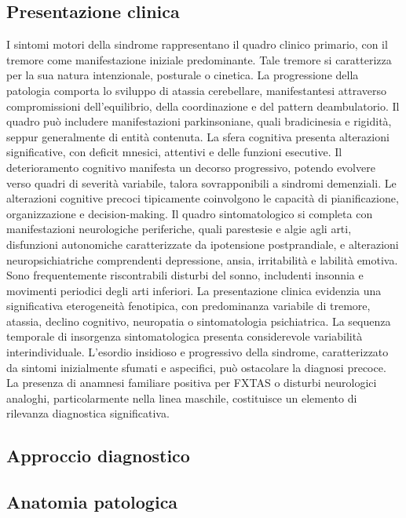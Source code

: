\subsection{Presentazione clinica}
I sintomi motori della sindrome rappresentano il quadro clinico primario, con il tremore come manifestazione iniziale predominante. Tale tremore si caratterizza per la sua natura intenzionale, posturale o cinetica. La progressione della patologia comporta lo sviluppo di atassia cerebellare, manifestantesi attraverso compromissioni dell'equilibrio, della coordinazione e del pattern deambulatorio. Il quadro può includere manifestazioni parkinsoniane, quali bradicinesia e rigidità, seppur generalmente di entità contenuta.
La sfera cognitiva presenta alterazioni significative, con deficit mnesici, attentivi e delle funzioni esecutive. Il deterioramento cognitivo manifesta un decorso progressivo, potendo evolvere verso quadri di severità variabile, talora sovrapponibili a sindromi demenziali. Le alterazioni cognitive precoci tipicamente coinvolgono le capacità di pianificazione, organizzazione e decision-making.
Il quadro sintomatologico si completa con manifestazioni neurologiche periferiche, quali parestesie e algie agli arti, disfunzioni autonomiche caratterizzate da ipotensione postprandiale, e alterazioni neuropsichiatriche comprendenti depressione, ansia, irritabilità e labilità emotiva. Sono frequentemente riscontrabili disturbi del sonno, includenti insonnia e movimenti periodici degli arti inferiori.
La presentazione clinica evidenzia una significativa eterogeneità fenotipica, con predominanza variabile di tremore, atassia, declino cognitivo, neuropatia o sintomatologia psichiatrica. La sequenza temporale di insorgenza sintomatologica presenta considerevole variabilità interindividuale.
L'esordio insidioso e progressivo della sindrome, caratterizzato da sintomi inizialmente sfumati e aspecifici, può ostacolare la diagnosi precoce. La presenza di anamnesi familiare positiva per FXTAS o disturbi neurologici analoghi, particolarmente nella linea maschile, costituisce un elemento di rilevanza diagnostica significativa.

\subsection{Approccio diagnostico}


\subsection{Anatomia patologica}

